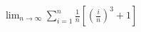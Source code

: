 \item $\displaystyle \lim_{n \to \infty} \sum_{i=1}^n \frac{1}{n} \left[ \left( \frac{i}{n} \right)^3 + 1 \right]$
